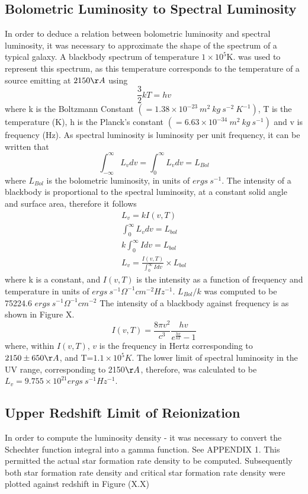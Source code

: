 \documentclass[pdf,color]{UoBnote}
\begin{document}
\subsection{Bolometric Luminosity to Spectral Luminosity}
In order to deduce a relation between bolometric luminosity and spectral luminosity, it was necessary to approximate the shape of the spectrum of a typical galaxy. A blackbody spectrum of temperature $1\times 10^5$K. was used to represent this spectrum, as this temperature corresponds to the temperature of a source emitting at $2150\AA$ using
\begin{equation}
\frac{3}{2}kT=hv
\end{equation}
\newline
where k is the Boltzmann Constant $(=1.38\times10^{-23} \ m^2 \ kg \ s^{-2} \ K^{-1})$, T is the temperature (K), h is the Planck's constant $(=6.63\times 10^{-34} \ m^{2} \ kg \ s^{-1})$ and v is frequency (Hz). As spectral luminosity is luminosity per unit frequency, it can be written that
\begin{equation}
\int^{\infty}_{-\infty}L_v dv = \int^{\infty}_{0}L_v dv = L_{Bol}
\end{equation} 
where $L_{Bol}$ is the bolometric luminosity, in units of $ergs \ s^{-1}$. The intensity of a blackbody is proportional to the spectral luminosity, at a constant solid angle and surface area, therefore it follows 
\begin{eqnarray}
L_v= kI(v,T) \\
\int^{\infty}_{0}L_v dv=L_{bol} \\
k\int^{\infty}_{0}I dv=L_{bol} \\
L_v = \frac{I(v,T)}{\int^{\infty}_{0}I dv} \times L_{bol}
\end{eqnarray}
where k is a constant, and $I(v,T)$ is the intensity as a function of frequency and temperature in units of $ergs \ s^{-1} \Omega^{-1} cm^{-2} Hz^{-1}$. $L_{Bol}/k$ was computed to be 75224.6 $ergs \ s^{-1} \Omega^{-1} cm^{-2}$ The intensity of a blackbody against frequency is as shown in Figure X.
\begin{equation}
I(v,T)=\frac{8\pi v^2}{c^3}\frac{hv}{e^\frac{hv}{kT}-1}
\end{equation}
where, within $I(v,T)$, $v$ is the frequency in Hertz corresponding to $2150\pm 650 \AA$, and T=$1.1\times 10^5K$. The lower limit of spectral luminosity in the UV range, corresponding to 2150$\AA$, therefore, was calculated to be $L_v =9.755\times 10^{21} ergs \ s^{-1} Hz^{-1}$.
\clearpage
\subsection{Upper Redshift Limit of Reionization}
In order to compute the luminosity density - it was necessary to convert the Schechter function integral into a gamma function. See APPENDIX 1.
This permitted the actual star formation rate density to be computed. Subsequently both star formation rate density and critical star formation rate density were plotted against redshift in Figure (X.X)
\end{document}
